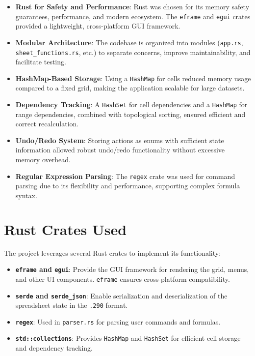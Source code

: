 \documentclass{article}
\begin{document}
\begin{itemize}
    \item \textbf{Rust for Safety and Performance}: Rust was chosen for its memory safety guarantees, performance, and modern ecosystem. The \texttt{eframe} and \texttt{egui} crates provided a lightweight, cross-platform GUI framework.
    \item \textbf{Modular Architecture}: The codebase is organized into modules (\texttt{app.rs}, \texttt{sheet\_functions.rs}, etc.) to separate concerns, improve maintainability, and facilitate testing.
    \item \textbf{HashMap-Based Storage}: Using a \texttt{HashMap} for cells reduced memory usage compared to a fixed grid, making the application scalable for large datasets.
    \item \textbf{Dependency Tracking}: A \texttt{HashSet} for cell dependencies and a \texttt{HashMap} for range dependencies, combined with topological sorting, ensured efficient and correct recalculation.
    \item \textbf{Undo/Redo System}: Storing actions as enums with sufficient state information allowed robust undo/redo functionality without excessive memory overhead.
    \item \textbf{Regular Expression Parsing}: The \texttt{regex} crate was used for command parsing due to its flexibility and performance, supporting complex formula syntax.
\end{itemize}

\section{Rust Crates Used}
The project leverages several Rust crates to implement its functionality:

\begin{itemize}
    \item \textbf{\texttt{eframe} and \texttt{egui}}: Provide the GUI framework for rendering the grid, menus, and other UI components. \texttt{eframe} ensures cross-platform compatibility.
    \item \textbf{\texttt{serde} and \texttt{serde\_json}}: Enable serialization and deserialization of the spreadsheet state in the \texttt{.290} format.
    \item \textbf{\texttt{regex}}: Used in \texttt{parser.rs} for parsing user commands and formulas.
    \item \textbf{\texttt{std::collections}}: Provides \texttt{HashMap} and \texttt{HashSet} for efficient cell storage and dependency tracking.
\end{itemize}
\end{document}
